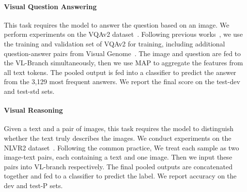 \paragraph{Visual Question Answering}
This task requires the model to answer the question based on an image. We perform experiments on the VQAv2 dataset~\cite{vqav2}.
Following previous works~\cite{ofa,albef,blip,x-vlm}, we use the training and validation set of VQAv2 for training, including additional question-answer pairs from Visual Genome~\cite{vg}.
The image and question are fed to the VL-Branch simultaneously, then we use MAP to aggregate the features from all text tokens.
The pooled output is fed into a classifier to predict the answer from the 3,129 most frequent answers.
We report the final score on the test-dev and test-std sets.


\paragraph{Visual Reasoning}
Given a text and a pair of images, this task requires the model to distinguish whether the text truly describes the images. We conduct experiments on the NLVR2 dataset~\cite{nlvr2}.
Following the common practice, We treat each sample as two image-text pairs, each containing a text and one image. Then we input these pairs into VL-branch respectively.
The final pooled outputs are concatenated together and fed to a classifier to predict the label. 
We report accuracy on the dev and test-P sets.


